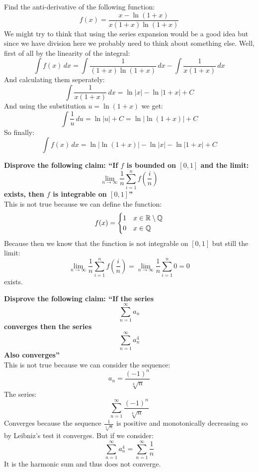 \documentclass[11pt,a4paper]{article}
\begin{document}
	\newpage
	Find the anti-derivative of the following function:
	\[
		f(x) = \frac{x - \ln(1+x)}{x(1+x)\ln(1+x)}
	\]
	We might try to think that using the series expansion would be a good
	idea but since we have division here we probably need to think about
	something else. Well, first of all by the linearity of the integral:
	\[
		\int{f(x)\,dx} = 
		\int\frac{1}{(1+x)\ln(1+x)}\,dx -
		\int\frac{1}{x(1+x)}\,dx
	\]
	And calculating them seperately:
	\[
		\int\frac{1}{x(1+x)}\,dx = \ln|x| - \ln|1+x| + C
	\]
	And using the substitution $u = \ln(1+x)$ we get:
	\[
		\int\frac{1}{u}\,du = \ln|u| + C = \ln|\ln(1+x)| + C
	\]
	So finally:
	\[
		\int{f(x)\,dx} = \ln|\ln(1+x)| - \ln|x| - \ln|1+x| + C
	\]
	
	\newpage
	\textbf{
	Disprove the following claim: ``If $f$ is bounded on $[0,1]$ and the 
	limit:
	\[
		\lim_{n\to\infty}
		{\frac{1}{n}\sum_{i=1}^{n}{f\left(\frac{i}{n}\right)}}
	\]
	exists, then $f$ is integrable on $[0,1]$''} \\
	This is not true because we can define the function:
	\[
		f(x) = \begin{cases}
		1 &x\in\mathbb{R}\setminus\mathbb{Q} \\
		0 &x\in\mathbb{Q}
		\end{cases}
	\]
	Because then we know that the function is not integrable on $[0,1]$
	but still the limit:
	\[
		\lim_{n\to\infty}
		{\frac{1}{n}\sum_{i=1}^{n}{f\left(\frac{i}{n}\right)}} = 
		\lim_{n\to\infty}
		{\frac{1}{n}\sum_{i=1}^{n}{0}} = 0
	\]
	exists.
	
	\newpage
	
	\textbf{
	Disprove the following claim: ``If the series
	\[
		\sum_{n=1}^{\infty}{a_n}
	\]
	converges then the series
	\[
		\sum_{n=1}^{\infty}{a_n^4}
	\]
	Also converges''} \\
	This is not true because we can consider the sequence:
	\[
		a_n = \frac{(-1)^n}{\sqrt[4]{n}}
	\]
	The series:
	\[
		\sum_{n=1}^{\infty}{\frac{(-1)^n}{\sqrt[4]{n}}}
	\]
	Converges because the sequence $\frac{1}{\sqrt[4]{n}}$ is positive
	and monotonically decreasing so by Leibniz's test it converges. But
	if we consider:
	\[
		\sum_{n=1}^{\infty}{a_n^4} = 
		\sum_{n=1}^{\infty}{\frac{1}{n}}
	\]
	It is the harmonic sum and thus does not converge.
	
	\newpage
	
\end{document}
